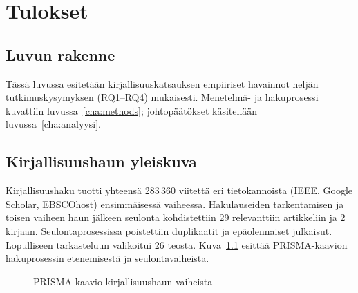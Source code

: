 \documentclass[bscthesis,finnish,oneside,biblatex]{uefcsthesis}
\begin{document}
\chapter{Tulokset}
\label{cha:tulokset}

\section*{Luvun rakenne}
Tässä luvussa esitetään kirjallisuuskatsauksen empiiriset havainnot
neljän tutkimuskysymyksen (RQ1–RQ4) mukaisesti.  Menetelmä- ja
hakuprosessi kuvattiin luvussa~\ref{cha:methods}; johtopäätökset
käsitellään luvussa~\ref{cha:analyysi}.

\section{Kirjallisuushaun yleiskuva}

Kirjallisuushaku tuotti yhteensä 283\,360 viitettä eri tietokannoista (IEEE, Google Scholar, EBSCOhost) ensimmäisessä vaiheessa.
Hakulauseiden tarkentamisen ja toisen vaiheen haun jälkeen seulonta kohdistettiin 29 relevanttiin artikkeliin ja 2 kirjaan.
Seulontaprosessissa poistettiin duplikaatit ja epäolennaiset julkaisut. Lopulliseen tarkasteluun valikoitui 26 teosta.
Kuva~\ref{fig:prisma} esittää PRISMA-kaavion hakuprosessin etenemisestä ja seulontavaiheista.


\begin{figure}[h]
  \centering
  \caption{PRISMA-kaavio kirjallisuushaun vaiheista}
  \label{fig:prisma}
\end{figure}
\end{document}
